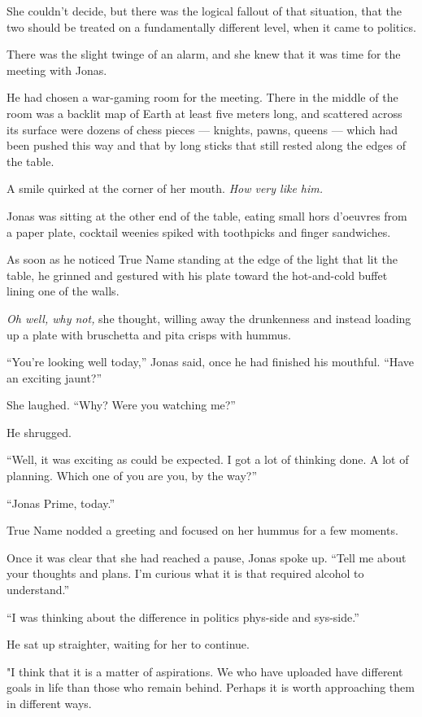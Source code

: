 She couldn't decide, but there was the logical fallout of that situation, that the two should be treated on a fundamentally different level, when it came to politics.

There was the slight twinge of an alarm, and she knew that it was time for the meeting with Jonas.

He had chosen a war-gaming room for the meeting. There in the middle of the room was a backlit map of Earth at least five meters long, and scattered across its surface were dozens of chess pieces — knights, pawns, queens — which had been pushed this way and that by long sticks that still rested along the edges of the table.

A smile quirked at the corner of her mouth. \emph{How very like him.}

Jonas was sitting at the other end of the table, eating small hors d'oeuvres from a paper plate, cocktail weenies spiked with toothpicks and finger sandwiches.

As soon as he noticed True Name standing at the edge of the light that lit the table, he grinned and gestured with his plate toward the hot-and-cold buffet lining one of the walls.

\emph{Oh well, why not,} she thought, willing away the drunkenness and instead loading up a plate with bruschetta and pita crisps with hummus.

``You're looking well today,'' Jonas said, once he had finished his mouthful. ``Have an exciting jaunt?''

She laughed. ``Why? Were you watching me?''

He shrugged.

``Well, it was exciting as could be expected. I got a lot of thinking done. A lot of planning. Which one of you are you, by the way?''

``Jonas Prime, today.''

True Name nodded a greeting and focused on her hummus for a few moments.

Once it was clear that she had reached a pause, Jonas spoke up. ``Tell me about your thoughts and plans. I'm curious what it is that required alcohol to understand.''

``I was thinking about the difference in politics phys-side and sys-side.''

He sat up straighter, waiting for her to continue.

"I think that it is a matter of aspirations. We who have uploaded have different goals in life than those who remain behind. Perhaps it is worth approaching them in different ways.

